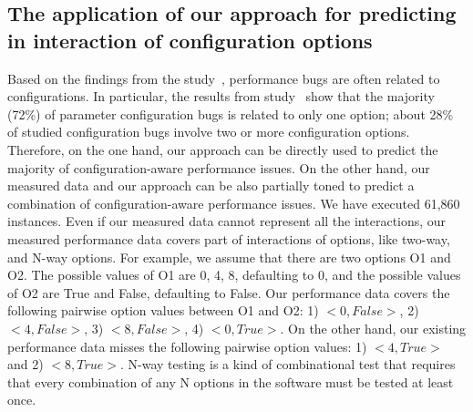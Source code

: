 \subsection{The application of our approach for predicting \inconsistent in interaction of configuration options}
Based on the findings from the study~\cite{RN2864}, performance bugs are often related to configurations. In particular, the results from study~\cite{RN2864} show that the majority (72\%) of parameter configuration bugs is related to only one option; about 28\% of studied configuration bugs involve two or more configuration options. 
Therefore, on the one hand, our approach can be directly used to predict the majority of configuration-aware performance issues. On the other hand, our measured data and our approach can be also partially toned to predict a combination of configuration-aware performance issues. We have executed 61,860 \instance instances. Even if our measured data cannot represent all the interactions, our measured performance data covers part of interactions of options, like two-way, and N-way options. For example, we assume that there are two options O1 and O2. The possible values of O1 are 0, 4, 8, defaulting to 0, and the possible values of O2 are True and False, defaulting to False. Our performance data covers the following pairwise option values between O1 and O2: 1) $<0, False>$, 2) $<4, False>$, 3) $<8, False>$, 4) $<0, True>$. On the other hand, our existing performance data misses the following pairwise option values: 1) $<4, True>$ and 2) $<8, True>$. N-way testing is a kind of combinational test that requires that every combination of any N options in the software must be tested at least once.

